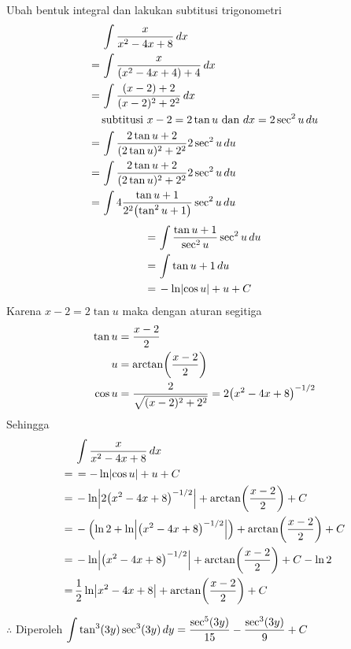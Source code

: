 \begin{enumerate}[leftmargin=*, label={\arabic*}.]
\begin{enumerate}[label={\alph*}.]
    Ubah bentuk integral dan lakukan subtitusi trigonometri
    \begin{align*}
        &\int \frac{x}{x^{2}-4x+8}\,dx\\
        =\,&\int \frac{x}{\brk*{x^{2}-4x+4}+4}\,dx\\
        =\,&\int \frac{(x-2)+2}{(x-2)^{2}+2^2}\,dx\\
        &\text{subtitusi $x-2 = 2\tan u$ dan $dx = 2\sec^{2}u\,du$}\\
        =\,&\int \frac{2\tan u+2}{(2\tan u)^{2}+2^2}2\sec^{2}u\,du\\
        =\,&\int \frac{2\tan u+2}{(2\tan u)^{2}+2^2}2\sec^{2}u\,du\\
        =\,&\int 4\frac{\tan u+1}{2^{2}\brk*{\tan^{2}u+1}}\sec^{2}u\,du\\
    \end{align*}
    \begin{align*}
        =\,&\int \frac{\tan u+1}{\sec^{2}u}\sec^{2}u\,du\\
        =\,&\int \tan u+1\,du\\
        =\,&-\ln\lvert\cos u\rvert + u+C\\
    \end{align*}
    Karena $x-2 = 2\tan u$ maka dengan aturan segitiga
    \begin{align*}
        \tan u &= \frac{x-2}{2}\\
        u &= \arctan\brk*{\frac{x-2}{2}}\\
        \cos u &= \frac{2}{\sqrt{(x-2)^{2}+2^{2}}} = 2\brk*{x^{2}-4x+8}^{-1/2}
    \end{align*}
    Sehingga 
    \begin{align*}
        &\int \frac{x}{x^{2}-4x+8}\,dx\\
        =\,&=-\ln\abs{\cos u} + u+C\\
        =\,&-\ln\abs*{2\brk*{x^{2}-4x+8}^{-1/2}} + \arctan\brk*{\frac{x-2}{2}}+C\\
        =\,&-\brk*{\ln 2 + \ln\abs*{\brk*{x^{2}-4x+8}^{-1/2}}} 
        + \arctan\brk*{\frac{x-2}{2}}+C\\
        =\,&-\ln\abs*{\brk*{x^{2}-4x+8}^{-1/2}} 
        + \arctan\brk*{\frac{x-2}{2}}+C-\ln 2\\
        =\,&\frac{1}{2}\ln\abs*{x^{2}-4x+8}+\arctan\brk*{\frac{x-2}{2}}+C\\
    \end{align*}

    $\therefore$ Diperoleh $\displaystyle\int \tan^{3}(3y)\sec^{3}(3y)\,dy
    =\frac{\sec^{5}(3y)}{15}-\frac{\sec^{3}(3y)}{9}+C$



\end{enumerate}
\end{enumerate}
